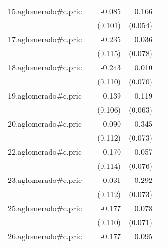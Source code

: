 {\begin{longtable}{l*{4}{D{.}{.}{-1}}}
\addlinespace
15.aglomerado#c.pric&                     &      -0.085         &       0.166\sym{**} &                     \\
            &                     &     (0.101)         &     (0.054)         &                     \\
\addlinespace
17.aglomerado#c.pric&                     &      -0.235\sym{*}  &       0.036         &                     \\
            &                     &     (0.115)         &     (0.078)         &                     \\
\addlinespace
18.aglomerado#c.pric&                     &      -0.243\sym{*}  &       0.010         &                     \\
            &                     &     (0.110)         &     (0.070)         &                     \\
\addlinespace
19.aglomerado#c.pric&                     &      -0.139         &       0.119         &                     \\
            &                     &     (0.106)         &     (0.063)         &                     \\
\addlinespace
20.aglomerado#c.pric&                     &       0.090         &       0.345\sym{***}&                     \\
            &                     &     (0.112)         &     (0.073)         &                     \\
\addlinespace
22.aglomerado#c.pric&                     &      -0.170         &       0.057         &                     \\
            &                     &     (0.114)         &     (0.076)         &                     \\
\addlinespace
23.aglomerado#c.pric&                     &       0.031         &       0.292\sym{***}&                     \\
            &                     &     (0.112)         &     (0.073)         &                     \\
\addlinespace
25.aglomerado#c.pric&                     &      -0.177         &       0.078         &                     \\
            &                     &     (0.110)         &     (0.071)         &                     \\
\addlinespace
26.aglomerado#c.pric&                     &      -0.177         &       0.095         &                     \\

\end{longtable}}
